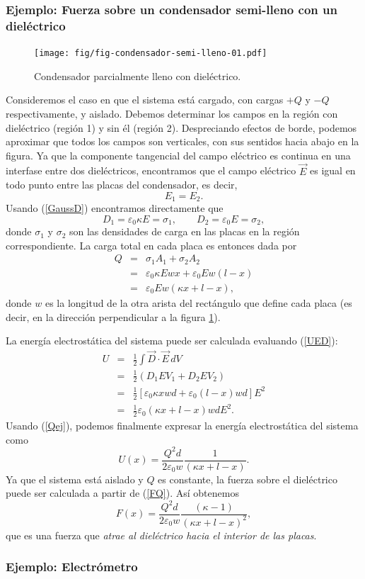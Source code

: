 \subsubsection{Ejemplo: Fuerza sobre un condensador semi-lleno con un
dieléctrico}
\begin{figure}[!h]
\centerline{\texttt{[image: fig/fig-condensador-semi-lleno-01.pdf]}}
\caption{Condensador parcialmente lleno con dieléctrico.}
\label{fig:fccd}
\end{figure}
Consideremos el caso en que el sistema está cargado, con cargas $+Q$ y $-Q$
respectivamente, y aislado. Debemos determinar los campos en la región con
dieléctrico (región 1) y sin él (región 2). Despreciando efectos de borde,
podemos aproximar que todos los campos son verticales, con sus sentidos hacia
abajo en la figura. Ya que la componente tangencial del campo eléctrico es
continua en una interfase entre dos dieléctricos, encontramos que el campo
eléctrico $\vec{E}$ es igual en todo punto entre las placas del condensador,
es decir,
\begin{equation}
 E_1=E_2.
\end{equation}
Usando (\ref{GaussD}) encontramos directamente que
\begin{equation}
 D_1=\varepsilon_0\kappa E=\sigma_1, \qquad D_2=\varepsilon_0 E=\sigma_2,
\end{equation}
donde $\sigma_1$ y $\sigma_2$ son las densidades de carga en las placas en la
región correspondiente. La carga total en cada placa es entonces dada por
\begin{eqnarray}
 Q&=&\sigma_1A_1+\sigma_2A_2 \\
&=& \varepsilon_0\kappa E w x+\varepsilon_0E w (l-x) \\
&=& \varepsilon_0Ew\left(\kappa x+l-x\right), \label{Qej}
\end{eqnarray}
donde $w$ es la longitud de la otra arista del rectángulo que define cada placa (es decir, en la dirección perpendicular a la figura \ref{fig:fccd}).

La energía electrostática del sistema puede ser calculada evaluando
(\ref{UED}):
\begin{eqnarray}
 U&=&\frac{1}{2}\int\vec{D}\cdot\vec{E}\,dV \\
&=&\frac{1}{2}\left(D_1EV_1+D_2EV_2\right) \\
&=&\frac{1}{2}\left[\varepsilon_0\kappa
xwd+\varepsilon_0(l-x)wd\right]E^2 \\
&=&\frac{1}{2}\varepsilon_0\left(\kappa x+l-x\right)wdE^2 .
\end{eqnarray}
Usando (\ref{Qej}), podemos finalmente expresar la energía electrostática
del sistema como
\begin{equation}
U(x)=\frac{Q^2d}{2\varepsilon_0 w}\frac{1}{(\kappa x+l-x)}.
\end{equation}
Ya que el sistema está aislado y $Q$ es constante, la fuerza sobre el
dieléctrico puede ser calculada a partir de (\ref{FQ}). Así obtenemos
\begin{equation}
 F(x)=\frac{Q^2d}{2\varepsilon_0 w}\frac{(\kappa-1)}{(\kappa x+l-x)^2},
\end{equation}
que es una fuerza que \textit{atrae al dieléctrico hacia el interior de las
placas}.

\subsubsection{Ejemplo: Electrómetro}